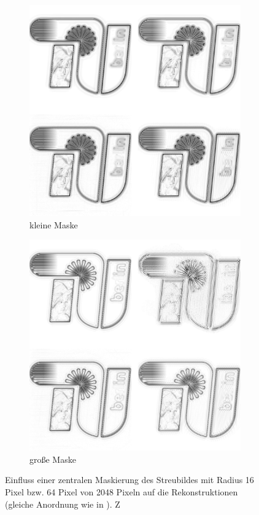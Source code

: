 \begin{figure}
	
	\begin{subfigure}[b]{0.48\textwidth}
		\includegraphics[width=\textwidth]{images/recon2d-mask16.png}
		\caption{kleine Maske}
	\end{subfigure}
	\hspace*{\fill}
	\begin{subfigure}[b]{0.48\textwidth}
		\includegraphics[width=\textwidth]{images/recon2d-mask64.png}
		\caption{große Maske}	
	\end{subfigure}
	\caption[2D Rekonstruktion: Beamstop]{Einfluss einer zentralen Maskierung des Streubildes mit Radius 16 Pixel bzw. 64 Pixel von 2048 Pixeln auf die Rekonstruktionen (gleiche Anordnung wie in ). Z}
	\label{fig:recon2d-mask}
\end{figure}


